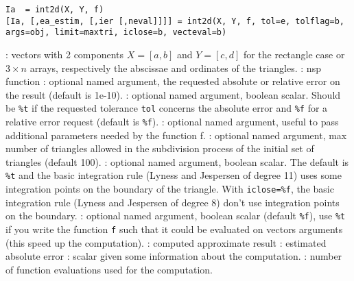 
\begin{mandesc}
\end{mandesc}

\begin{calling_sequence}
\begin{verbatim}
Ia  = int2d(X, Y, f)
[Ia, [,ea_estim, [,ier [,neval]]]] = int2d(X, Y, f, tol=e, tolflag=b, args=obj, limit=maxtri, iclose=b, vecteval=b)
\end{verbatim}
\end{calling_sequence}
\begin{parameters}
  \begin{varlist}
    : vectors with 2 components $X=[a,b]$ and $Y=[c,d]$ for
    the rectangle case or  $3 \times n$ arrays, respectively the
    abscissae and ordinates of the triangles.
    : nsp function
    : optional named argument, the requested absolute or
    relative error on the result (default is 1e-10).
    : optional named argument, boolean scalar. Should be
    \verb+%t+ if the requested tolerance \verb+tol+ concerns the absolute
     error and \verb+%f+ for a relative error request (default is \verb+%f+).
    : optional named argument, useful to pass
    additional parameters needed by the function f.
    : optional named argument, max number of
    triangles allowed in the subdivision process of the initial set of
    triangles (default 100).
    : optional named argument, boolean scalar. The
    default is \verb+%t+ and the basic integration rule (Lyness and 
    Jespersen of degree 11) uses some integration points on the
    boundary of the triangle. With \verb+iclose=%f+, the basic
    integration rule (Lyness and Jespersen of degree 8) don't
    use integration points on the boundary.
    : optional named argument, boolean scalar
    (default \verb+%f+), use \verb+%t+ if you write the function
    \verb+f+ such that it could be evaluated on vectors arguments 
    (this speed up the computation).
    : computed approximate result
    : estimated absolute error
    : scalar given some information about the computation.
    : number of function evaluations used for the computation.
  \end{varlist}
\end{parameters}


